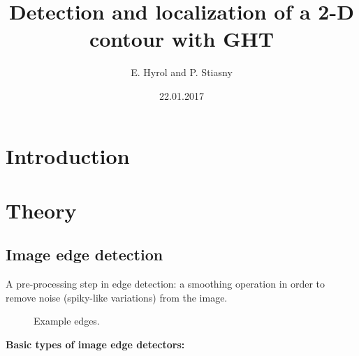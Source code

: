 \documentclass[letterpaper,12pt]{article}
\begin{document}
\title{Detection and localization of a 2-D contour with GHT}
\author{E. Hyrol and P. Stiasny}
\date{22.01.2017}
\maketitle

%


\section{Introduction}



\section{Theory}

\subsection{Image edge detection}

A pre-processing step in edge detection: a smoothing operation in order to remove noise (spiky-like variations) from the image.


\begin{figure}[!th]
  \centering
  \hfill
  \caption{Example edges.}
\end{figure}

\textbf{Basic types of image edge detectors: }
\end{document}

